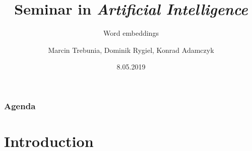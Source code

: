 \documentclass[handout,compress]{beamer} %
\title%
{Seminar in \emph{Artificial Intelligence}}
\subtitle{Word embeddings}
\author[]{Marcin Trebunia, Dominik Rygiel, Konrad Adamczyk}
\institute[KT AGH]{Department of Telecommunications}%
\date{8.05.2019} %
\begin{document}
\begin{frame}
    \titlepage
    \nobibliography* %
\end{frame}


\renewcommand{\logosinfootline}{\raisebox{0.12cm}{\begin{beamercolorbox}{rafi}{Seminar \quad Topic (change, please!) \hfill \insertframenumber/\inserttotalframenumber}\end{beamercolorbox}}}

\begin{frame}[allowframebreaks]
    \frametitle{Agenda}
    \tableofcontents
\end{frame}



\section{Introduction} %

\end{document}
